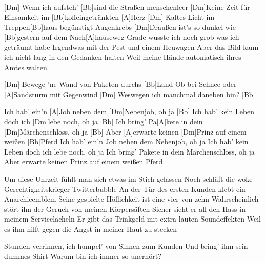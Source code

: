 



\begin{guitar}
	[Dm] Wenn ich aufsteh' [Bb]sind die Straßen menschenleer
	[Dm]Keine Zeit für Einsamkeit im [Bb]koffeingetränkten [A]Herz
	[Dm] Kaltes Licht im Treppen[Bb]haus begünstigt Augenkrebs
	[Dm]Draußen ist's so dunkel wie [Bb]gestern auf dem Nach[A]hauseweg
	Grade wusste ich noch grob was ich geträumt habe
	Irgendwas mit der Pest und einem Heuwagen
	Aber das Bild kann ich nicht lang in den Gedanken halten
	Weil meine Hände automatisch ihres Amtes walten
	
	[Dm] Bewege 'ne Wand von Paketen durchs [Bb]Land
	Ob bei Schnee oder [A]Sandsturm mit Gegenwind
	[Dm] Weswegen ich manchmal daneben bin? [Bb]{}
	
	Ich hab' ein'n [A]Job neben dem [Dm]Nebenjob, oh ja [Bb]{}
	Ich hab' kein Leben doch ich [Dm]lebe noch, oh ja [Bb]{}
	Ich bring' Pa[A]kete in dein [Dm]Märchenschloss, oh ja [Bb]{}
	Aber [A]erwarte keinen [Dm]Prinz auf einem weißen [Bb]Pferd
	Ich hab' ein'n Job neben dem Nebenjob, oh ja
	Ich hab' kein Leben doch ich lebe noch, oh ja
	Ich bring' Pakete in dein Märchenschloss, oh ja
	Aber erwarte keinen Prinz auf einem weißen Pferd
	
	\pagebreak
	Um diese Uhrzeit fühlt man sich etwas im Stich gelassen
	Noch schläft die woke Gerechtigkeitskrieger-Twitterbubble
	An der Tür des ersten Kunden klebt ein Anarchieemblem
	Seine gespielte Höflichkeit ist eine vier von zehn
	Wahrscheinlich stört ihn der Geruch von meinen Körpersäften
	Sicher sieht er all den Hass in meinem Servicelächeln
	Er gibt das Trinkgeld mit extra lauten Soundeffekten
	Weil es ihm hilft gegen die Angst in meiner Haut zu stecken
	
	Stunden verrinnen, ich humpel' von Sinnen zum Kunden
	Und bring' ihm sein dummes Shirt
	Warum bin ich immer so unerhört?
	
	 
\end{guitar}
